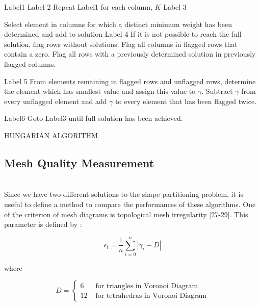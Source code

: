 \begin{algorithm}[H]
Label1  \;
Label 2  \; 
{Repeat Label1 for each column, $K$}
Label 3  \; 

Select element in columns for which a distinct minimum weight has been determined and add to solution \newline
Label 4 \;
If it is not possible to reach the full solution, flag rows without solutions. Flag all columns in flagged rows that contain a zero. Flag all rows with a previously determined solution in previously flagged columns.
     
Label 5 \;
From elements remaining in flagged rows and unflagged rows, determine the element which has smallest value and assign this value to $\gamma$. Subtract $\gamma$  from every unflagged element and add  $\gamma$ to every element that has been flagged twice.
     
Label6 \;
Goto Label3 until full solution has been achieved. \newline
     
\caption{HUNGARIAN ALGORITHM}
\end{algorithm}

\subsection{Mesh Quality Measurement}\hspace{0pt} \\
Since we have two different solutions to the shape partitioning problem, it is useful to define a method to compare the performances of these algorithms. One of the criterion of mesh diagrams is topological mesh irregularity [27-29]. This parameter is defined by : 

\begin{equation}
\epsilon _t = \frac{1}{n} \sum_{i = 0}^{n} |\gamma _i - D|
\end{equation}
	
where 

\begin{equation}
D = \left\{ \begin{array}{rl}
6                               &\mbox{ for triangles in Voronoi Diagram} \\
12                             &\mbox{ for tetrahedras in Voronoi Diagram}
\end{array} \right.
\end{equation}
	
